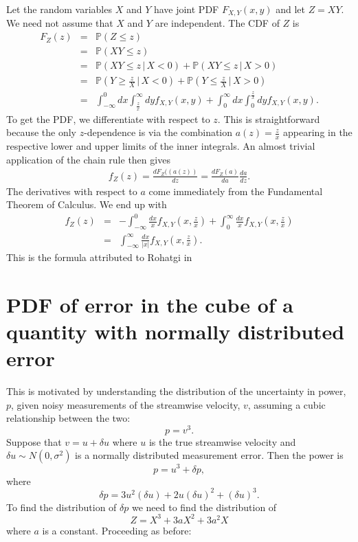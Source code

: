 \documentclass[11pt]{article}
\newcommand*{\bksp}{ \!\!\!\!\!}
\newcommand{\dd}[2]{\frac{d {#1}}{d {#2}}}
\begin{document}
\begin{multicols}{2}
Let the random variables $X$ and $Y$ have joint PDF $F_{X,Y}(x,y)$ and let $Z = X Y$. 
We need not assume that $X$ and $Y$ are independent.
The CDF of $Z$ is
\begin{eqnarray*}
F_Z(z) &=& \mathbb{P}(Z \leq z)\\
&=& \mathbb{P}(X Y \leq z)\\
&=& \mathbb{P}(X Y \leq z\, |\, X<0) +  \mathbb{P}(X Y \leq z\, |\, X>0)\\
&=&  \mathbb{P}\left(Y \geq \frac{z}{X}\, |\, X<0\right) +  \mathbb{P}\left(Y \leq \frac{z}{X}\, |\, X>0\right)\\
&=& \int_{-\infty}^0 \bksp dx \!\! \int_\frac{z}{x}^\infty \bksp dy f_{X,Y}(x, y) + \int_0^{\infty}\bksp dx \!\! \int_0^\frac{z}{x}\bksp dy f_{X,Y}(x, y).
\end{eqnarray*}
To get the PDF, we differentiate with respect to $z$. 
This is straightforward because the only $z$-dependence is via the combination $a(z) = \frac{z}{x}$ appearing in the respective lower and upper limits of the inner integrals.
An almost trivial application of the chain rule then gives
\begin{align*}
f_Z(z) = \dd{F_Z((a(z))}{z} = \dd{F_Z(a)}{a} \dd{a}{z}.
\end{align*}
The derivatives with respect to $a$ come immediately from the Fundamental Theorem of Calculus.
We end up with
\begin{eqnarray}
\nonumber f_Z(z) &=&   - \int_{-\infty}^0 \!\! \frac{dx}{x}   f_{X,Y}(x, \frac{z}{x}) +  \int_0^{\infty}\!\! \frac{dx}{x}   f_{X,Y}(x, \frac{z}{x}) \\
\label{eq-Rohatgi}&=& \int_{-\infty}^\infty \!\! \frac{dx}{| x |}  f_{X,Y}(x, \frac{z}{x}) .
\end{eqnarray}
This is the formula attributed to Rohatgi \cite{rohatgi1976introduction} in \cite{cui2016exact}


 \section{PDF of error in the cube of a quantity with normally distributed error}
 This is motivated by understanding the distribution of the uncertainty in power, $p$, given noisy measurements of the streamwise velocity, $v$, assuming a cubic relationship between the two:
 \begin{equation}
 p = v^3.
 \end{equation}
 Suppose that $v = u + \delta u$ where $u$ is the true streamwise velocity and $\delta u \sim N(0,\sigma^2)$ is a normally distributed measurement error. Then the power is 
 \begin{equation}
 p = u^3 + \delta p, 
 \end{equation}
 where 
 \begin{equation}
 \delta p = 3 u^2 (\delta u) + 2 u (\delta u)^2 + (\delta u)^3.
 \end{equation}
 To find the distribution of $\delta p$ we need to find the distribution of 
 \begin{equation}
 Z = X^3 + 3 a X^2 + 3 a^2 X
 \end{equation}
 where $a$ is a constant. Proceeding as before:
 

\end{multicols}
\end{document}
